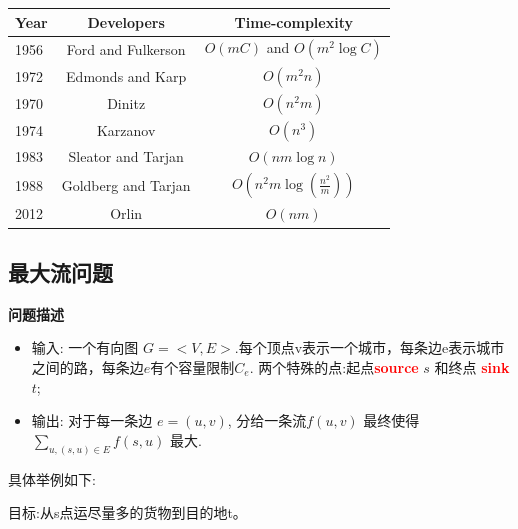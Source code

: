 \begin{table}[H]
   {\begin{tabular}{lcc}\hline
        Year  & Developers &  Time-complexity  \\
\hline
1956 & Ford and Fulkerson & $O(m C)$ and $O(m^2\log C)$ \\
1972 & Edmonds and Karp & $O(m^2 n)$ \\
1970 & Dinitz & $O(n^2 m)$ \\
1974 & Karzanov & $O(n^3)$ \\
1983 & Sleator and Tarjan & $O(nm \log n)$ \\
1988 & Goldberg and Tarjan & $O(n^2 m \log(\frac{n^{2}}{m}))$ \\
2012  & Orlin	& $O(nm)$ \\ \hline

     \end{tabular}} {}%
 \end{table}
\subsection{最大流问题}


\textbf{问题描述}
\begin{itemize}

\item 输入:
  一个有向图 $G=<V, E>$.每个顶点v表示一个城市，每条边e表示城市之间的路，每条边$e$有个容量限制$C_e$. 两个特殊的点:起点\textcolor{red}{\bf source} $s$ 和终点 \textcolor{red}{\bf sink} $t$;
\item 输出:
 对于每一条边 $e=(u, v)$, 分给一条流$f(u, v)$ 最终使得$\sum_{u, (s,u)\in E} f{(s,u)}$ 最大.
\end{itemize}

具体举例如下:
\begin{figure}[H]
\end{figure}
目标:从s点运尽量多的货物到目的地t。

